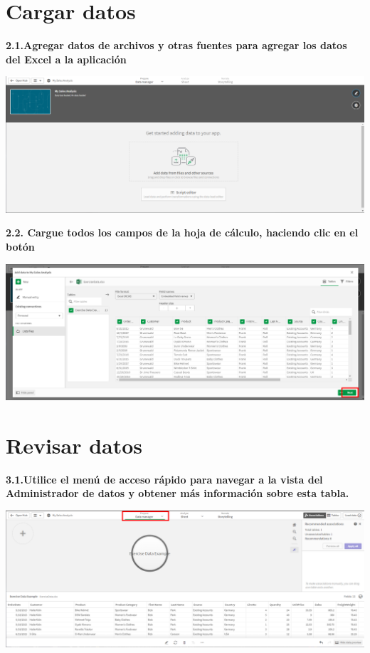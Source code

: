 \documentclass{article}
\begin{document}
\section{Cargar datos}

\textbf{2.1.Agregar datos de archivos y otras fuentes para agregar los datos del Excel a la aplicación}

    \begin{center}
		\includegraphics[width=14cm]{./images/3} 
	\end{center}
	
	
\newpage
\textbf{2.2.  Cargue todos los campos de la hoja de cálculo, haciendo clic en el botón}

    \begin{center}
		\includegraphics[width=14cm]{./images/3.1} 
	\end{center}
	
\section{Revisar datos}

\textbf{3.1.Utilice el menú de acceso rápido para navegar a la 
vista del Administrador de datos y obtener más información sobre esta tabla.}

    \begin{center}
		\includegraphics[width=14cm]{./images/4} 
	\end{center}
	
\end{document}
